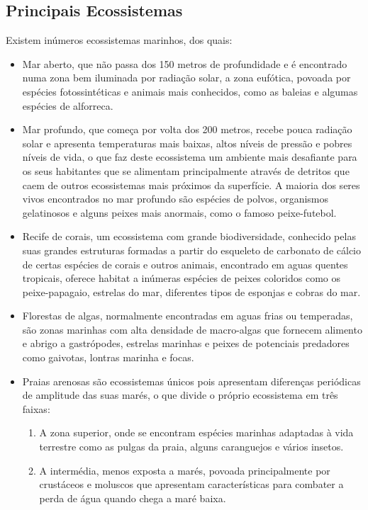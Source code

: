 \documentclass{report}
\begin{document}
\subsection{Principais Ecossistemas}
\label{sub.ecossistemas}
Existem inúmeros ecossistemas marinhos, dos quais:
\begin{itemize}
    \item Mar aberto, que não passa dos 150 metros de profundidade e é encontrado numa zona bem iluminada por radiação solar, a zona eufótica, povoada por espécies fotossintéticas e animais mais conhecidos, como as baleias e algumas espécies de alforreca. 
    \item Mar profundo, que começa por volta dos 200 metros, recebe pouca radiação solar e apresenta temperaturas mais baixas, altos níveis de pressão e pobres níveis de vida, o que faz deste ecossistema um ambiente mais desafiante para os seus habitantes que se alimentam principalmente através de detritos que caem de outros ecossistemas mais próximos da superfície. A maioria dos seres vivos encontrados no mar profundo são espécies de polvos, organismos gelatinosos e alguns peixes mais anormais, como o famoso peixe-futebol.
    \item Recife de corais, um ecossistema com grande biodiversidade, conhecido pelas suas grandes estruturas formadas a partir do esqueleto de carbonato de cálcio de certas espécies de corais e outros animais, encontrado em aguas quentes tropicais, oferece habitat a inúmeras espécies de peixes coloridos como os peixe-papagaio, estrelas do mar, diferentes tipos de esponjas e cobras do mar.
    \item Florestas de algas, normalmente encontradas em aguas frias ou temperadas, são zonas marinhas com alta densidade de macro-algas que fornecem alimento e abrigo a gastrópodes, estrelas marinhas e peixes de potenciais predadores como gaivotas, lontras marinha e focas.
    \item Praias arenosas são ecossistemas únicos pois apresentam diferenças periódicas de amplitude das suas marés, o que divide o próprio ecossistema em três faixas: 
    \begin{enumerate}
        \item A zona superior, onde se encontram espécies marinhas adaptadas à vida terrestre como as pulgas da praia, alguns caranguejos e vários insetos.
        \item A intermédia, menos exposta a marés, povoada principalmente por crustáceos e moluscos que apresentam características para combater a perda de água quando chega a maré baixa.

\end{enumerate}
\end{itemize}
\end{document}
